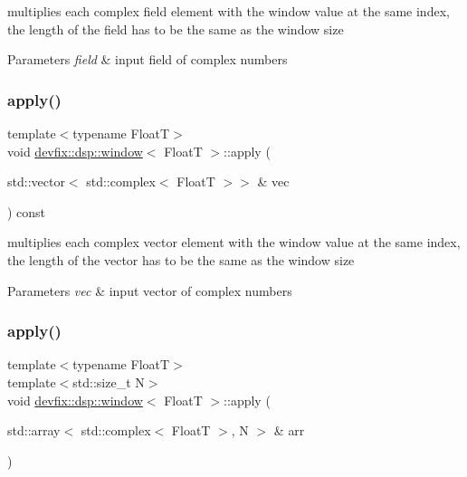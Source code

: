 multiplies each complex field element with the window value at the same index, the length of the field has to be the same as the window size 


\begin{DoxyParams}{Parameters}
{\em field} & input field of complex numbers \\
\hline
\end{DoxyParams}
\mbox{\label{structdevfix_1_1dsp_1_1window_a7d9fb193d2286f50aabc2ea0243a5465}} 
\subsubsection{\texorpdfstring{apply()}{apply()}\hspace{0.1cm}{\footnotesize\ttfamily [5/6]}}
{\footnotesize\ttfamily template$<$typename FloatT$>$ \\
void \hyperlink{structdevfix_1_1dsp_1_1window}{devfix\+::dsp\+::window}$<$ FloatT $>$\+::apply (\begin{DoxyParamCaption}\item[{std\+::vector$<$ std\+::complex$<$ FloatT $>$$>$ \&}]{vec }\end{DoxyParamCaption}) const\hspace{0.3cm}{\ttfamily [inline]}}



multiplies each complex vector element with the window value at the same index, the length of the vector has to be the same as the window size 


\begin{DoxyParams}{Parameters}
{\em vec} & input vector of complex numbers \\
\hline
\end{DoxyParams}
\mbox{\label{structdevfix_1_1dsp_1_1window_a3b101f8761a003d0bdbd90c6f1de2183}} 
\subsubsection{\texorpdfstring{apply()}{apply()}\hspace{0.1cm}{\footnotesize\ttfamily [6/6]}}
{\footnotesize\ttfamily template$<$typename FloatT$>$ \\
template$<$std\+::size\+\_\+t N$>$ \\
void \hyperlink{structdevfix_1_1dsp_1_1window}{devfix\+::dsp\+::window}$<$ FloatT $>$\+::apply (\begin{DoxyParamCaption}\item[{std\+::array$<$ std\+::complex$<$ FloatT $>$, N $>$ \&}]{arr }\end{DoxyParamCaption})\hspace{0.3cm}{\ttfamily [inline]}}




